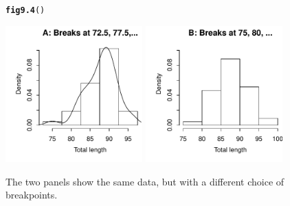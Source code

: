 \documentclass[12pt, a4paper,  BCOR=8.25mm, DIV=15]{scrartcl}\usepackage[]{graphicx}\usepackage[]{color}
\makeatletter
\newcommand{\hlstd}[1]{\textcolor[rgb]{0.345,0.345,0.345}{#1}}%
\newcommand{\hlkwd}[1]{\textcolor[rgb]{0.737,0.353,0.396}{\textbf{#1}}}%
\newenvironment{kframe}{%
 \def\at@end@of@kframe{}%
 \ifinner\ifhmode%
  \def\at@end@of@kframe{\end{minipage}}%
  \begin{minipage}{\columnwidth}%
 \fi\fi%
 \def\FrameCommand##1{\hskip\@totalleftmargin \hskip-\fboxsep
 \colorbox{shadecolor}{##1}\hskip-\fboxsep
     \hskip-\linewidth \hskip-\@totalleftmargin \hskip\columnwidth}%
 \MakeFramed {\advance\hsize-\width
   \@totalleftmargin\z@ \linewidth\hsize
   \@setminipage}}%
 {\par\unskip\endMakeFramed%
 \at@end@of@kframe}
\newenvironment{knitrout}{}{} %
\makeatother
\begin{document}
\begin{figure}[ht]
\begin{knitrout}
\color{fgcolor}\begin{kframe}
\begin{alltt}
\hlkwd{fig9.4}\hlstd{()}
\end{alltt}
\end{kframe}

{\centering \includegraphics[width=0.47\textwidth]{figs/gph-fig9_4e-1} 
\includegraphics[width=0.47\textwidth]{figs/gph-fig9_4e-2} 

}



\end{knitrout}
\caption{The two panels show the same data, but with a different
choice of breakpoints.\label{fig:densitybreaks}}
\end{figure}
\end{document}
